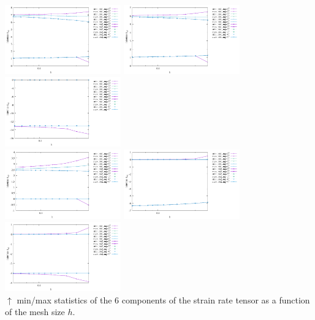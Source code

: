 \begin{center}
\includegraphics[width=5cm]{python_codes/fieldstone_75/results/burst/exx_stats.pdf}
\includegraphics[width=5cm]{python_codes/fieldstone_75/results/burst/eyy_stats.pdf}
\includegraphics[width=5cm]{python_codes/fieldstone_75/results/burst/ezz_stats.pdf}\\
\includegraphics[width=5cm]{python_codes/fieldstone_75/results/burst/exy_stats.pdf}
\includegraphics[width=5cm]{python_codes/fieldstone_75/results/burst/exz_stats.pdf}
\includegraphics[width=5cm]{python_codes/fieldstone_75/results/burst/eyz_stats.pdf}\\
{\captionfont $\uparrow$ min/max statistics of the 6 components of the strain rate tensor
as a function of the mesh size $h$.}
\end{center}


